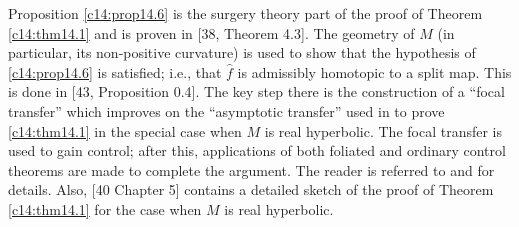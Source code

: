 Proposition \ref{c14:prop14.6} is the surgery theory part of the proof
of Theorem \ref{c14:thm14.1} and is proven in [38, Theorem 4.3]. The
geometry of $M$ (in particular, its non-positive curvature) is used to
show that the hypothesis of \ref{c14:prop14.6} is satisfied; i.e.,
that $\hat{f}$ is admissibly homotopic to a split map. This is done in
[43, Proposition 0.4]. The key step there is the construction of a
``focal transfer'' which improves on the ``asymptotic transfer'' used
in \cite{38} to prove \ref{c14:thm14.1} in the special case when $M$
is real hyperbolic. The focal transfer is used to gain control; after
this, applications of both foliated and ordinary control theorems are
made to complete the argument. The reader is referred to \cite{43} and
\cite{38} for details. Also, [40 Chapter 5] contains a detailed sketch
of the proof of Theorem \ref{c14:thm14.1} for the case when $M$ is
real hyperbolic.
